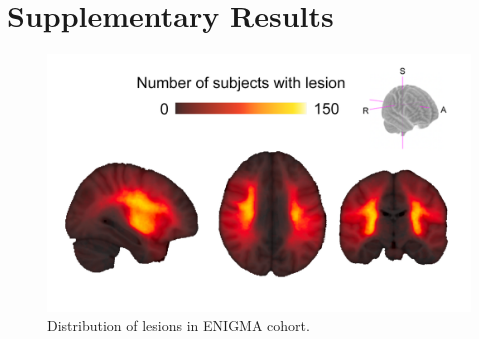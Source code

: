 \documentclass[10pt]{article}
\begin{document}
 



\section*{Supplementary Results}

\begin{figure}[ht]
\centering
\includegraphics[width=0.8\linewidth]{figures/distribution_lesions.png}
\caption{Distribution of lesions in ENIGMA cohort.}
\label{lesiondist}
\end{figure}
\end{document}
